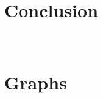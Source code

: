 \documentclass[english, twocolumn]{article}
\begin{document}
\section*{Conclusion} 

\section{\\Graphs} \label{App:AppendixA}
\end{document}
